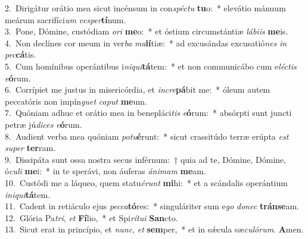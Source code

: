 {2.~}Dirigátur orátio mea sicut incénsum in con\textit{spé}\textit{ctu} \textbf{tu}o:~* elevátio mánuum meárum sacrifíci\textit{um} \textit{ve}\textit{sper}\textbf{tí}num.\\
{3.~}Pone, Dómine, custódiam \textit{o}\textit{ri} \textbf{me}o:~* et óstium circumstántiæ \textit{lá}\textit{bi}\textit{is} \textbf{me}is.\\
{4.~}Non declínes cor meum in ver\textit{ba} \textit{ma}\textbf{lí}tiæ:~* ad excusándas excusatió\textit{nes} \textit{in} \textit{pec}\textbf{cá}tis.\\
{5.~}Cum homínibus operántibus i\textit{ni}\textit{qui}\textbf{tá}tem:~* et non communicábo cum e\textit{lé}\textit{ctis} \textit{e}\textbf{ó}rum.\\
{6.~}Corrípiet me justus in misericórdia, et \textit{in}\textit{cre}\textbf{pá}bit me:~* óleum autem peccatóris non impín\textit{guet} \textit{ca}\textit{put} \textbf{me}um.\\
{7.~}Quóniam adhuc et orátio mea in benepláci\textit{tis} \textit{e}\textbf{ó}rum:~* absórpti sunt juncti petræ jú\textit{di}\textit{ces} \textit{e}\textbf{ó}rum.\\
{8.~}Audient verba mea quóniam \textit{po}\textit{tu}\textbf{é}runt:~* sicut crassitúdo terræ erúpta \textit{est} \textit{su}\textit{per} \textbf{ter}ram.\\
{9.~}Dissipáta sunt ossa nostra secus inférnum:~† quia ad te, Dómine, Dómine, ó\textit{cu}\textit{li} \textbf{me}i:~* in te sperávi, non áuferas \textit{á}\textit{ni}\textit{mam} \textbf{me}am.\\
{10.~}Custódi me a láqueo, quem statu\textit{é}\textit{runt} \textbf{mi}hi:~* et a scándalis operántium \textit{i}\textit{ni}\textit{qui}\textbf{tá}tem.\\
{11.~}Cadent in retiáculo ejus \textit{pec}\textit{ca}\textbf{tó}res:~* singuláriter sum e\textit{go} \textit{do}\textit{nec} \textbf{trán}\textbf{se}am.\\
{12.~}Glória Pa\textit{tri}, \textit{et} \textbf{Fí}lio,~* et Spi\textit{rí}\textit{tu}\textit{i} \textbf{San}cto.\\
{13.~}Sicut erat in princípio, et \textit{nunc}, \textit{et} \textbf{sem}per,~* et in sǽcula sæ\textit{cu}\textit{ló}\textit{rum}. \textbf{A}men.\\
